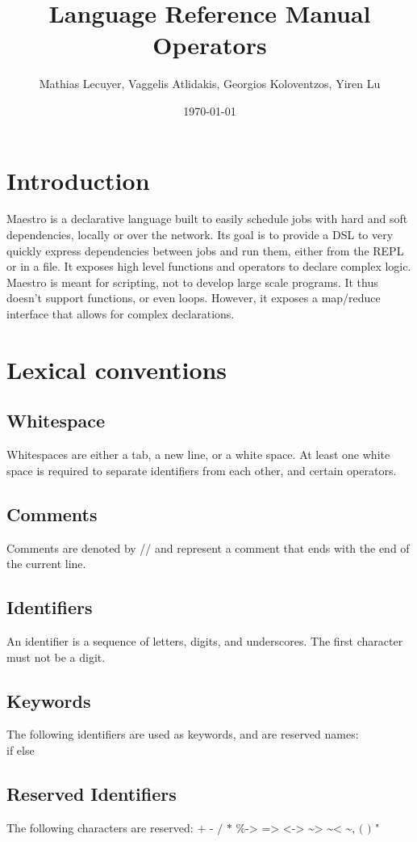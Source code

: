 \documentclass[12pt]{article}
\title{Language Reference Manual Operators}
\author{Mathias Lecuyer, Vaggelis Atlidakis, Georgios Koloventzos, Yiren Lu}
\date{\today}
\begin{document}
\maketitle
\tableofcontents
\newpage

\section{Introduction}
Maestro is a declarative language built to easily schedule jobs with hard and soft dependencies, locally or over the network.
Its goal is to provide a DSL to very quickly express dependencies between jobs and run them, either from the REPL or in a file.
It exposes high level functions and operators to declare complex logic. Maestro is meant for scripting, not to develop large
scale programs. It thus doesn't support functions, or even loops. However, it exposes a map/reduce interface that allows for
complex declarations.

\section{Lexical conventions}
\subsection{Whitespace}
Whitespaces are either a tab, a new line, or a white space. At least one white space is required to separate identifiers from
each other, and certain operators.

\subsection{Comments}
Comments are denoted by // and represent a comment that ends with the end of the current line.

\subsection{Identifiers}
An identifier is a sequence of letters, digits, and underscores. The first character must not be a digit.

\subsection{Keywords}
The following identifiers are used as keywords, and are reserved names:\\
if else

\subsection{Reserved Identifiers}
The following characters are reserved: $\texttt{+ - / * \% -> => <-> \textasciitilde>
\textasciitilde< \textasciitilde , ( ) "}$
\end{document}
